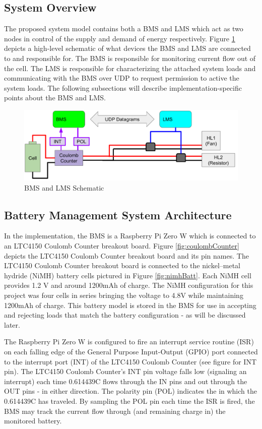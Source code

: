 \documentclass[11pt,conference,draftcls,onecolumn]{IEEEtran}
\begin{document}
\subsection{System Overview}
The proposed system model contains both a BMS and LMS which act as two nodes in control of the supply and demand of energy respectively.
Figure \ref{fig:bmsModel} depicts a high-level schematic of what devices the BMS and LMS are connected to and responsible for.
The BMS is responsible for monitoring current flow out of the cell.
The LMS is responsible for characterizing the attached system loads and communicating with the BMS over UDP to request permission to active the system loads.
The following subsections will describe implementation-specific points about the BMS and LMS.
\begin{figure}[!htbp]
    \centering
    \includegraphics[width=6.5in]{img/uBmsModel.png}
    \caption{BMS and LMS Schematic}
    \label{fig:bmsModel}
\end{figure}
\clearpage
\subsection{Battery Management System Architecture}
In the implementation, the BMS is a Raspberry Pi Zero W \cite{rpiZeroW} which is connected to an LTC4150 Coulomb Counter breakout board.
Figure \ref{fig:coulombCounter} depicts the LTC4150 Coulomb Counter breakout board and its pin names.
The LTC4150 Coulomb Counter breakout board is connected to the nickel–metal hydride (NiMH) battery cells pictured in Figure \ref{fig:nimhBatt}.
Each NiMH cell provides 1.2 V and around 1200mAh of charge.
The NiMH configuration for this project was four cells in series bringing the voltage to 4.8V while maintaining 1200mAh of charge.
This battery model is stored in the BMS for use in accepting and rejecting loads that match the battery configuration - as will be discussed later.

The Raspberry Pi Zero W is configured to fire an interrupt service routine (ISR) on each falling edge of the General Purpose Input-Output (GPIO) port connected to the interrupt port (INT) of the LTC4150 Coulomb Counter (see figure for INT pin).
The LTC4150 Coulomb Counter's INT pin voltage falls low (signaling an interrupt) each time 0.614439C flows through the IN pins and out through the OUT pins - in either direction.
The polarity pin (POL) indicates the in which the 0.614439C has traveled.
By sampling the POL pin each time the ISR is fired, the BMS may track the current flow through (and remaining charge in) the monitored battery. 
\end{document}
